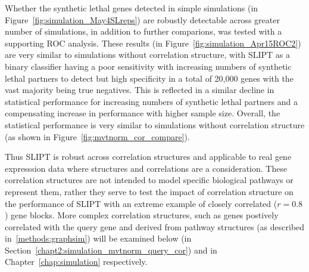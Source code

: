 Whether the \gls{synthetic lethal} genes detected in simple simulations (in Figure~\ref{fig:simulation_May4SLreps}) are robustly detectable across greater number of simulations, in addition to further comparions, was tested with a supporting \gls{ROC} analysis. These results (in Figure~\ref{fig:simulation_Apr15ROC2}) are very similar to simulations without correlation structure, with \gls{SLIPT} as a binary classifier having a poor sensitivity with increasing numbers of \gls{synthetic lethal} partners to detect but high specificity in a total of 20,000 genes with the vast majority being true negatives. This is reflected in a similar decline in statistical performance for increasing numbers of \gls{synthetic lethal} partners and a compensating increase in performance with higher sample size. Overall, the statistical performance is very similar to simulations without correlation structure (as shown in Figure~\ref{fig:mvtnorm_cor_compare}).

Thus \gls{SLIPT} is robust across correlation structures and applicable to real gene expresssion data where  structures and correlations are a consideration. These correlation structures are not intended to model specific biological pathways or represent them, rather they serve to test the impact of correlation structure on the performance of \gls{SLIPT} with an extreme example of closely correlated ($r = 0.8$) gene blocks. More complex correlation structures, such as genes postively correlated with the query gene and derived from pathway  structures (as described in~\ref{methods:graphsim}) will be examined below (in Section~\ref{chapt2:simulation_mvtnorm_query_cor}) and in Chapter~\ref{chap:simulation} respectively.


